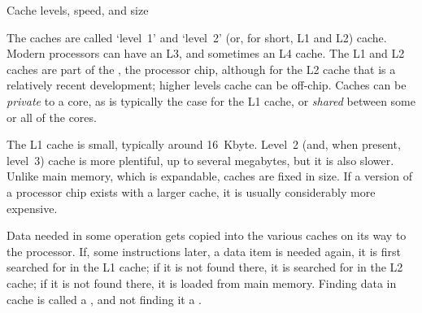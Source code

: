  {Cache levels, speed, and size}
\label{sec:cache-level}

The caches are called `level~1' and `level~2' (or, for short, L1 and
L2) cache.
Modern processors can have an L3, and sometimes an L4 cache.
The L1 and L2 caches
are part of the , the processor chip, although for the
L2 cache that is a relatively recent development;
higher levels cache can be off-chip.
Caches can be \emph{private} to a core,
as is typically the case for the L1 cache,
or \emph{shared} between some or all of the cores.

The L1 cache is small, typically around 16~Kbyte.
Level~2 (and, when present, level~3) cache is more plentiful,
up to several
megabytes, but it is also slower.  Unlike main memory, which is
expandable, caches are fixed in size. If a version of a processor chip
exists with a larger cache, it is usually considerably more expensive.

Data needed in some operation gets copied into the various
caches on its way to the processor. If, some instructions later, a
data item is needed again, it is first searched for in the L1 cache; if it is
not found there, it is searched for in the L2 cache; if it is not found there,
it is loaded from main memory. Finding data in cache is called a
, and not finding it a .


